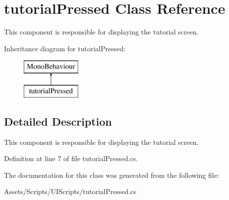 \hypertarget{classtutorial_pressed}{\section{tutorial\+Pressed Class Reference}
\label{classtutorial_pressed}
}


This component is responsible for displaying the tutorial screen.  


Inheritance diagram for tutorial\+Pressed\+:\begin{figure}[H]
\begin{center}
\leavevmode
\includegraphics[height=2.000000cm]{classtutorial_pressed}
\end{center}
\end{figure}


\subsection{Detailed Description}
This component is responsible for displaying the tutorial screen. 



Definition at line 7 of file tutorial\+Pressed.\+cs.



The documentation for this class was generated from the following file\+:\begin{DoxyCompactItemize}
\item 
Assets/\+Scripts/\+U\+I\+Scripts/tutorial\+Pressed.\+cs\end{DoxyCompactItemize}
